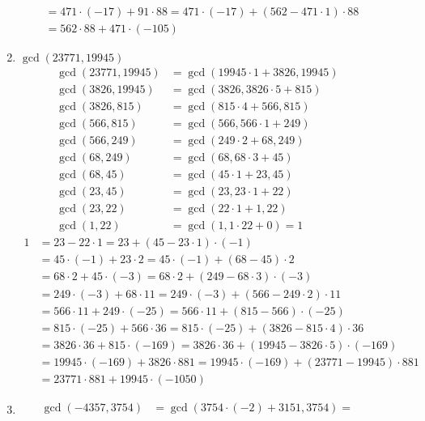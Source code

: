 \begin{description}
\begin{enumerate}
\begin{align*}
     \\
  &= 471 \cdot (-17) + 91 \cdot 88 = 471 \cdot (-17) + (562 - 471 \cdot 1)
     \cdot 88 \\
  &= 562 \cdot 88 + 471 \cdot (-105)
\end{align*}
\item $\gcd(23771, 19945)$
\begin{align*}
\gcd(23771, 19945) &= \gcd(19945 \cdot 1 + 3826, 19945) \\
\gcd(3826, 19945)  &= \gcd(3826, 3826 \cdot 5 + 815) \\
\gcd(3826, 815)    &= \gcd(815 \cdot 4 + 566, 815) \\
\gcd(566,  815)    &= \gcd(566, 566 \cdot 1 + 249) \\
\gcd(566,  249)    &= \gcd(249 \cdot 2 + 68, 249) \\
\gcd(68,   249)    &= \gcd(68, 68 \cdot 3 + 45) \\
\gcd(68,    45)    &= \gcd(45 \cdot 1 + 23, 45) \\
\gcd(23,    45)    &= \gcd(23, 23 \cdot 1 + 22) \\
\gcd(23, 22)        &= \gcd(22 \cdot 1 + 1, 22) \\
\gcd(1,  22)        &= \gcd(1, 1 \cdot 22 + 0) = 1
\end{align*}
\begin{align*}
1 &= 23 - 22 \cdot 1 = 23 + (45 - 23 \cdot 1) \cdot (-1) \\
  &= 45 \cdot (-1) + 23 \cdot 2 = 45 \cdot (-1) + (68 - 45) \cdot 2 \\
  &= 68 \cdot 2 + 45 \cdot (-3) = 68 \cdot 2 + (249 - 68 \cdot 3) \cdot (-3) \\
  &= 249 \cdot (-3) + 68 \cdot 11 = 249 \cdot (-3) + (566 - 249 \cdot 2) \cdot
     11 \\
  &= 566 \cdot 11 + 249 \cdot (-25) = 566 \cdot 11 + (815 - 566) \cdot (-25) \\
  &= 815 \cdot (-25) + 566 \cdot 36 = 815 \cdot (-25) + (3826 - 815 \cdot 4)
     \cdot 36 \\
  &= 3826 \cdot 36 + 815 \cdot (-169) = 3826 \cdot 36 + (19945 - 3826 \cdot 5)
     \cdot (-169) \\
  &= 19945 \cdot (-169) + 3826 \cdot 881 = 19945 \cdot (-169) + (23771 -
     19945) \cdot 881 \\
  &= 23771 \cdot 881 + 19945 \cdot (-1050)
\end{align*}
\item
\begin{align*}
\gcd(-4357, 3754) &= \gcd(3754 \cdot (-2) + 3151, 3754) = \\

\end{align*}
\end{enumerate}
\end{description}
